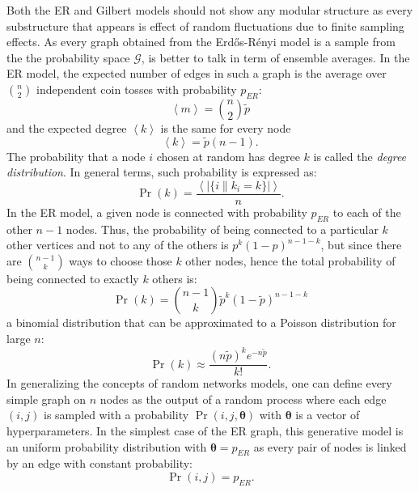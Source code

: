 Both the ER and Gilbert models should not show any modular structure as every substructure that appears is effect of random fluctuations due to finite sampling effects.
As every graph obtained from the Erd\H{o}s-Rényi model is a sample from the the probability space $\mathcal{G}$, is better to talk in term of ensemble averages. In the ER model, the expected number of edges in such a graph is the average over $\binom{n}{2}$ independent coin tosses with probability $p_{ER}$:
\begin{equation}
\left< m  \right> = \binom{n}{2}\tilde{p}
\end{equation}
and the expected degree $\left< k \right>$ is the same for every node
\begin{equation}
\left< k \right> = \tilde{p}(n-1).
\end{equation}
The probability that a node $i$ chosen at random has degree $k$ is called the \emph{degree distribution}. In general terms, such probability is expressed as:
\begin{equation}
\Pr(k) = \frac{\left< |\{ i \| k_i=k \}| \right>}{n}.
\end{equation}
In the ER model, a given node is connected with probability $p_{ER}$ to each of the other $n-1$ nodes. Thus, the probability of being connected to a particular $k$ other vertices and not to any of the others is $p^k(1-p)^{n-1-k}$, but since there are $\binom{n-1}{k}$ ways to choose those $k$ other nodes, hence the total probability of being connected to exactly $k$ others is:
\begin{equation}
\Pr(k) = \binom{n-1}{k}\tilde{p}^k(1-\tilde{p})^{n-1-k}
\end{equation}
a binomial distribution that can be approximated to a Poisson distribution for large $n$:
\begin{equation}
\Pr(k) \approx \frac{(n \tilde{p})^k e^{-n \tilde{p}} }{k!}.
\end{equation}
\bigbreak
In generalizing the concepts of random networks models, one can define every simple graph on $n$ nodes as the output of a random process where each edge $(i,j) $ is sampled with a probability $\Pr(i,j,{\boldsymbol \theta})$ with $\boldsymbol \theta$ is a vector of hyperparameters. In the simplest case of the ER graph, this generative model is an uniform probability distribution with $\boldsymbol \theta=p_{ER}$ as every pair of nodes is linked by an edge with constant probability:
\begin{equation}
\Pr(i,j) = p_{ER}.
\end{equation}

